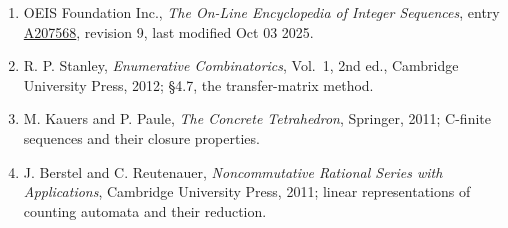 \documentclass[11pt]{article}
\theoremstyle{definition}
\begin{document}
\begin{enumerate}

\item OEIS Foundation Inc., \emph{The On-Line Encyclopedia of Integer Sequences}, entry \href{https://oeis.org/A207568}{A207568}, revision 9, last modified Oct 03 2025.

\item R. P. Stanley, \emph{Enumerative Combinatorics}, Vol.~1, 2nd ed., Cambridge University Press, 2012; \S4.7, the transfer-matrix method.

\item M. Kauers and P. Paule, \emph{The Concrete Tetrahedron}, Springer, 2011; C-finite sequences and their closure properties.

\item J. Berstel and C. Reutenauer, \emph{Noncommutative Rational Series with Applications}, Cambridge University Press, 2011; linear representations of counting automata and their reduction.

\end{enumerate}
\end{document}
